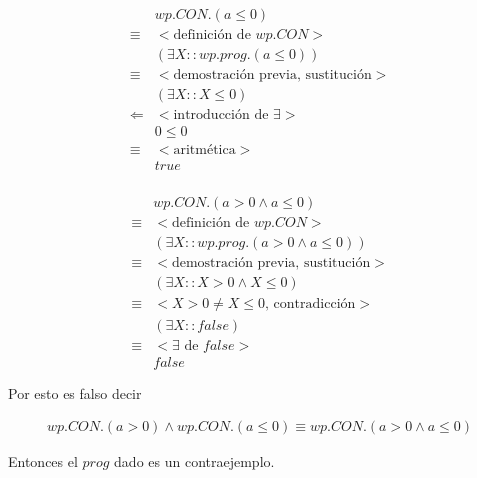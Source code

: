 \documentclass{article}
\begin{document}
\begin{align*}
 & wp.CON.(a \leq 0) \\
 \equiv & <\text{definición de } wp.CON> \\
 & (\exists X :: wp.prog.(a \leq 0)) \\
 \equiv & <\text{demostración previa, sustitución}> \\
 & (\exists X :: X \leq 0) \\
 \Leftarrow & <\text{introducción de } \exists> \\
 & 0 \leq 0 \\
 \equiv & <\text{aritmética}> \\
 & true \\
\end{align*}

\begin{align*}
 & wp.CON.(a > 0 \wedge a \leq 0) \\
 \equiv & <\text{definición de } wp.CON> \\
 & (\exists X :: wp.prog.(a > 0 \wedge a \leq 0)) \\
 \equiv & <\text{demostración previa, sustitución}> \\
 & (\exists X :: X > 0 \wedge X \leq 0) \\
 \equiv & <X > 0 \neq X \leq 0 \text{, contradicción}> \\
 & (\exists X :: false) \\
 \equiv & <\exists \text{ de } false> \\
 & false
\end{align*}

Por esto es falso decir

\begin{align*}
wp.CON.(a > 0) \wedge wp.CON.(a \leq 0) \equiv wp.CON.(a > 0 \wedge a \leq 0)
\end{align*}

Entonces el $prog$ dado es un contraejemplo.
\end{document}
